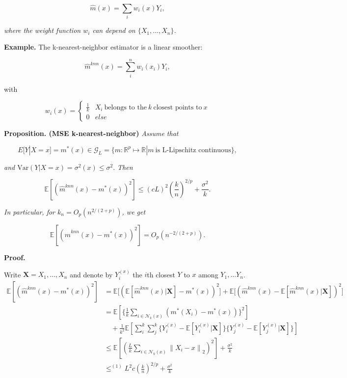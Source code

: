 \documentclass[
]{book}
\begin{document}
\[
\hat m(x)= \sum_i w_i(x)Y_i,
\]

\emph{where the weight function \(w_i\) can depend on \(\{X_1, \dots, X_n\}\).}

\textbf{Example.} The k-nearest-neighbor estimator is a linear smoother:

\[
\hat m^{knn}(x)= \sum_i^n w_i(x_i) Y_i,
\]

with

\[
w_i(x)=\begin{cases}\frac 1 k & X_i \ \text{belongs to the}\  k \ \text{closest points to}\  x \\ 0 & else\end{cases}
\]

\textbf{Proposition. (MSE k-nearest-neighbor)} \emph{Assume that}

\[
E[Y|X=x]=m^\ast(x)\in \mathcal G_L = \{m: \mathbb R^p \mapsto \mathbb R| m \ \text{is L-Lipschitz continuous}\},
\]

\emph{and \(\textrm{Var}(Y|X=x)=\sigma^2(x)\leq \sigma^2.\) Then }

\[
\mathbb E[(\hat m^{knn}(x)-m^\ast(x))^2]\leq (cL)^2 \left(\frac k n \right)^{2/p}+\frac {\sigma^2}k.
\]

\emph{In particular, for \(k_n=O_p( n^{2/(2+p)})\), we get }

\[
\mathbb E[(\hat m^{knn}(x)-m^\ast(x))^2]=O_p(n^{-2/(2+p)}).
\]

\textbf{Proof.}

Write \(\mathbf X=X_1,\dots, X_n\) and denote by \(Y_i^{(x)}\) the \(i\)th closest \(Y\) to \(x\) among \(Y_1,\dots Y_n\).
\begin{align*}\mathbb E[(\hat m^{knn}(x)-m^\ast(x))^2]& =\mathbb E \Big [{\left(\mathbb{E}[\hat m^{knn}(x)|\mathbf  X]-m^\ast(x)\right)^2}\Big]+{\mathbb{E}\Big[(\hat m^{knn}(x)-\mathbb{E}[\hat m^{knn}(x)|\mathbf  X])^2\Big]}\\
&=\mathbb E\left[ \Big \{\frac{1}{k} \sum_{i \in \mathcal{N}_k(x)}\left(m^\ast\left(X_i\right)-m^\ast(x)\right)\Big \}^2\right] \\ &\quad + \frac 1 {k^2} \mathbb E \left[ \sum_i^k \sum_j^k \{Y_i^{(x)}- \mathbb  E[Y_i^{(x)}| \mathbf X]\}\{Y_j^{(x)}- \mathbb  E[Y_j^{(x)}| \mathbf X]\} \right] \\
& \leq \mathbb  E\left[ \left(\frac{L}{k} \sum_{i \in \mathcal{N}_k(x)}\left\|X_i-x\right\|_2\right)^2 \right]+\frac{\sigma^2}{k} \\
&\leq^{(1)}  L^2 c \left(\frac k n \right)^{2/p}+\frac {\sigma^2}k
\end{align*}
\end{document}
